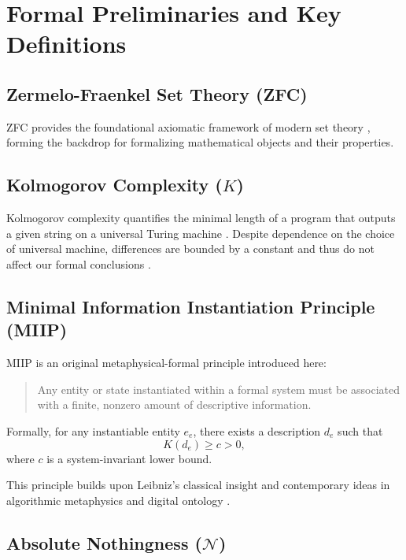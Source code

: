 \documentclass[12pt,a4paper]{article}
\begin{document}
\section{Formal Preliminaries and Key Definitions}

\subsection{Zermelo-Fraenkel Set Theory (ZFC)}

ZFC provides the foundational axiomatic framework of modern set theory \cite{Jech2003}, forming the backdrop for formalizing mathematical objects and their properties.

\subsection{Kolmogorov Complexity ($K$)}

Kolmogorov complexity quantifies the minimal length of a program that outputs a given string on a universal Turing machine \cite{Kolmogorov1965, Chaitin1966}. Despite dependence on the choice of universal machine, differences are bounded by a constant and thus do not affect our formal conclusions \cite{LiVitanyi2008}.

\subsection{Minimal Information Instantiation Principle (MIIP)}

MIIP is an original metaphysical-formal principle introduced here:

\begin{quote}
Any entity or state instantiated within a formal system must be associated with a finite, nonzero amount of descriptive information.
\end{quote}

Formally, for any instantiable entity $e_e$, there exists a description $d_e$ such that
\[
K(d_e) \geq c > 0,
\]
where $c$ is a system-invariant lower bound.

This principle builds upon Leibniz’s classical insight \cite{Leibniz1714} and contemporary ideas in algorithmic metaphysics and digital ontology \cite{Tegmark2008}.

\subsection{Absolute Nothingness ($\mathcal{N}$)}
\end{document}
